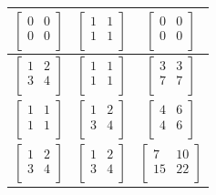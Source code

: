 \documentclass[a4paper,14pt]{report}
\begin{document}
\begin{table}[h!]
\begin{tabular}{|c | c | c |}
		$\begin{bmatrix}
		0 & 0 \\
		0 & 0 \\
		\end{bmatrix}$ &
		$\begin{bmatrix}
		1 & 1 \\
		1 & 1 \\
		\end{bmatrix}$ &
		$\begin{bmatrix}
		0 & 0 \\
		0 & 0 \\
		\end{bmatrix}$ \\
		\hline

		$\begin{bmatrix}
		1 & 2 \\
		3 & 4 \\
		\end{bmatrix}$ &
		$\begin{bmatrix}
		1 & 1 \\
		1 & 1 \\
		\end{bmatrix}$ &
		$\begin{bmatrix}
		3 & 3 \\
		7 & 7 \\
		\end{bmatrix}$ \\
		\hline

		$\begin{bmatrix}
		1 & 1 \\
		1 & 1 \\
		\end{bmatrix}$ &
		$\begin{bmatrix}
		1 & 2 \\
		3 & 4 \\
		\end{bmatrix}$ &
		$\begin{bmatrix}
		4 & 6 \\
		4 & 6 \\
		\end{bmatrix}$ \\
		\hline

		$\begin{bmatrix}
		1 & 2 \\
		3 & 4 \\
		\end{bmatrix}$ &
		$\begin{bmatrix}
		1 & 2 \\
		3 & 4 \\
		\end{bmatrix}$ &
		$\begin{bmatrix}
		7 & 10 \\
		15 & 22 \\
		\end{bmatrix}$ \\
		\hline


\end{tabular}
\end{table}
\end{document}

